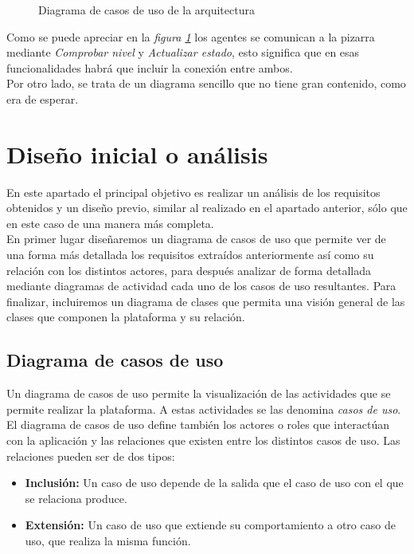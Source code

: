\begin{figure}[H]
\centering
\casosdeuso
\caption{Diagrama de casos de uso de la arquitectura}
\label{casodeuso1}
\end{figure}

Como se puede apreciar en la \emph{figura \ref{casodeuso1}} los agentes se comunican a la pizarra mediante \emph{Comprobar nivel} y \emph{Actualizar estado}, esto significa que en esas funcionalidades habrá que incluir la conexión entre ambos.\\

Por otro lado, se trata de un diagrama sencillo que no tiene gran contenido, como era de esperar.

\section{Diseño inicial o análisis}
En este apartado el principal objetivo es realizar un análisis de los requisitos obtenidos y un diseño previo, similar al realizado en el apartado anterior, sólo que en este caso de una manera más completa.\\

En primer lugar diseñaremos un diagrama de casos de uso que permite ver de una forma más detallada los requisitos extraídos anteriormente así como su relación con los distintos actores, para después analizar de forma detallada mediante diagramas de actividad cada uno de los casos de uso resultantes. Para finalizar, incluiremos un diagrama de clases que permita una visión general de las clases que componen la plataforma y su relación.\\


\subsection{Diagrama de casos de uso}\label{casosdeuso}
Un diagrama de casos de uso permite la visualización de las actividades que se permite realizar la plataforma. A estas actividades se las denomina \textit{casos de uso}. El diagrama de casos de uso define también los actores o roles que interactúan con la aplicación y las relaciones que existen entre los distintos casos de uso. Las relaciones pueden ser de dos tipos:

\begin{itemize}
	\item \textbf{Inclusión:} Un caso de uso depende de la salida que el caso de uso con el que se relaciona produce.
	\item \textbf{Extensión:} Un caso de uso que extiende su comportamiento a otro caso de uso, que realiza la misma función. 
\end{itemize}

